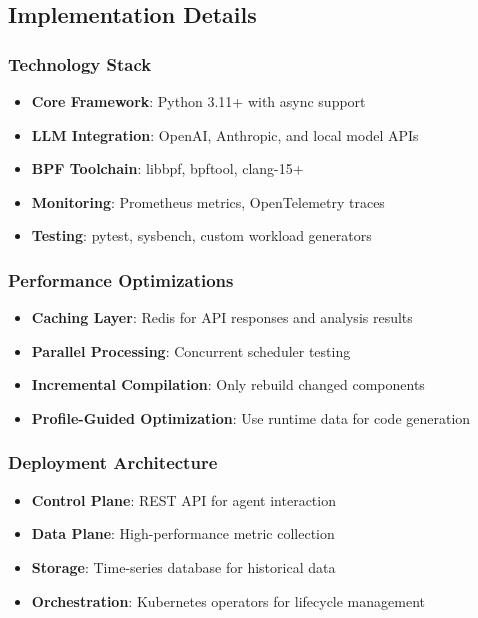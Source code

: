 \subsection{Implementation Details}

\subsubsection{Technology Stack}
\begin{itemize}
\item \textbf{Core Framework}: Python 3.11+ with async support
\item \textbf{LLM Integration}: OpenAI, Anthropic, and local model APIs
\item \textbf{BPF Toolchain}: libbpf, bpftool, clang-15+
\item \textbf{Monitoring}: Prometheus metrics, OpenTelemetry traces
\item \textbf{Testing}: pytest, sysbench, custom workload generators
\end{itemize}

\subsubsection{Performance Optimizations}
\begin{itemize}
\item \textbf{Caching Layer}: Redis for API responses and analysis results
\item \textbf{Parallel Processing}: Concurrent scheduler testing
\item \textbf{Incremental Compilation}: Only rebuild changed components
\item \textbf{Profile-Guided Optimization}: Use runtime data for code generation
\end{itemize}

\subsubsection{Deployment Architecture}
\begin{itemize}
\item \textbf{Control Plane}: REST API for agent interaction
\item \textbf{Data Plane}: High-performance metric collection
\item \textbf{Storage}: Time-series database for historical data
\item \textbf{Orchestration}: Kubernetes operators for lifecycle management
\end{itemize}